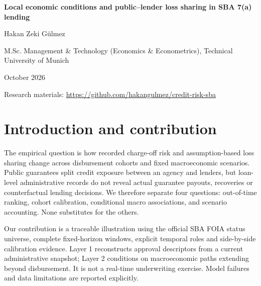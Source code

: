

\begin{center}
{\LARGE\bfseries Local economic conditions and public--lender loss sharing in SBA 7(a) lending}\par\vspace{6pt}
Hakan Zeki Gülmez\par
M.Sc. Management \& Technology (Economics \& Econometrics), Technical University of Munich\par
October 2026\par\small Research materials: \url{https://github.com/hakangulmez/credit-risk-sba}
\end{center}
\begin{abstract}
We examine out-of-time charge-off discrimination, calibration and conditional loss-sharing scenarios in approved and disbursed SBA lending. Term-free Firth logistic models separate reconstructed approval descriptors from future state macroeconomic paths. Crisis AUC is \AucCrisis, but predicted and recorded rates differ materially (\PdCrisis\% versus \RateCrisis\%). A conditional endpoint unemployment increase is associated with \Endpoint\ probability percentage points on the fixed reference portfolio. Baseline and adverse gross expected-loss proxies are \ElBase\ and \ElAdverse\ million dollars, with assumption-based public/lender allocation. Administrative measurement, unverified feature vintages, calibration failure, revised data and a post-results protocol amendment limit inference; these are neither causal effects nor measured fiscal costs.
\end{abstract}
\section{Introduction and contribution}
The empirical question is how recorded charge-off risk and assumption-based loss sharing change across disbursement cohorts and fixed macroeconomic scenarios. Public guarantees split credit exposure between an agency and lenders, but loan-level administrative records do not reveal actual guarantee payouts, recoveries or counterfactual lending decisions. We therefore separate four questions: out-of-time ranking, cohort calibration, conditional macro associations, and scenario accounting. None substitutes for the others.

Our contribution is a traceable illustration using the official SBA FOIA status universe, complete fixed-horizon windows, explicit temporal roles and side-by-side calibration evidence. Layer 1 reconstructs approval descriptors from a current administrative snapshot; Layer 2 conditions on macroeconomic paths extending beyond disbursement. It is not a real-time underwriting exercise. Model failures and data limitations are reported explicitly.

